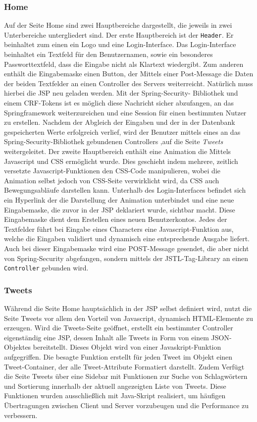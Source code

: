 \subsubsection*{Home}
Auf der Seite Home sind zwei Hauptbereiche dargestellt, die jeweils in zwei Unterbereiche 
untergliedert sind. Der erste Hauptbereich ist der \texttt{Header}. Er beinhaltet zum einen ein Logo 
und eine Login-Interface. 
Das Login-Interface beinhaltet ein Textfeld für den Benutzernamen, sowie ein besonderes 
Passworttextfeld, dass die Eingabe nicht als Klartext wiedergibt. Zum anderen enthält die Eingabemaske 
einen Button, der Mittels einer Post-Message die Daten der beiden Textfelder an einen Controller des 
Servers weiterreicht. Natürlich muss hierbei die JSP neu geladen werden. Mit der Spring-Security-
Bibliothek und einem CRF-Tokens ist es möglich diese Nachricht sicher abzufangen, an das 
Springframework weiterzureichen und eine Session für einen bestimmten Nutzer zu erstellen. Nachdem 
der Abgleich der Eingaben und der in der Datenbank gespeicherten Werte erfolgreich verlief, wird der 
Benutzer mittels eines an das  Spring-Security-Bibliothek gebundenen Controllers ,auf die Seite 
\textit{Tweets} weitergeleitet. 
Der zweite Hauptbereich enthält eine Animation die Mittels Javascript und CSS ermöglicht wurde. Dies 
geschieht indem mehrere, zeitlich versetzte Javascript-Funktionen den CSS-Code manipulieren, wobei die 
Animation selbst jedoch von CSS-Seite verwirklicht wird, da CSS auch Bewegungsabläufe darstellen kann. 
Unterhalb des Login-Interfaces befindet sich ein Hyperlink der die Darstellung der Animation 
unterbindet und eine neue Eingabemaske, die zuvor in der JSP deklariert wurde, sichtbar macht. Diese 
Eingabemaske dient dem Erstellen eines neuen Benutzerkontos. Jedes der Textfelder führt bei Eingabe 
eines Characters  eine Javascript-Funktion aus, welche die Eingaben validiert und dynamisch eine 
entsprechende Ausgabe liefert. Auch bei dieser Eingabemaske wird eine POST-Message gesendet, die aber 
nicht von Spring-Security abgefangen, sondern mittels der JSTL-Tag-Library an einen 
\texttt{Controller} gebunden wird. 

\subsubsection*{Tweets}
Während die Seite Home hauptsächlich in der JSP selbst definiert wird, nutzt die Seite Tweets vor 
allem den Vorteil von Javascript, dynamisch HTML-Elemente zu erzeugen. Wird die Tweets-Seite geöffnet, 
erstellt ein bestimmter Controller eigenständig eine JSP, dessen Inhalt alle Tweets in Form von einem 
JSON-Objektes bereitstellt. Dieses Objekt wird von einer Javaskript-Funktion aufgegriffen. Die besagte 
Funktion erstellt für jeden Tweet im Objekt einen Tweet-Container, der alle Tweet-Attribute Formatiert 
darstellt. Zudem Verfügt die Seite Tweets über eine Sidebar mit Funktionen zur Suche von Schlagwörtern 
und Sortierung innerhalb der aktuell angezeigten Liste von Tweets. Diese Funktionen wurden 
ausschließlich mit Java-Skript realisiert, um häufigen Übertragungen zwischen Client und Server 
vorzubeugen und die Performance zu verbessern.

